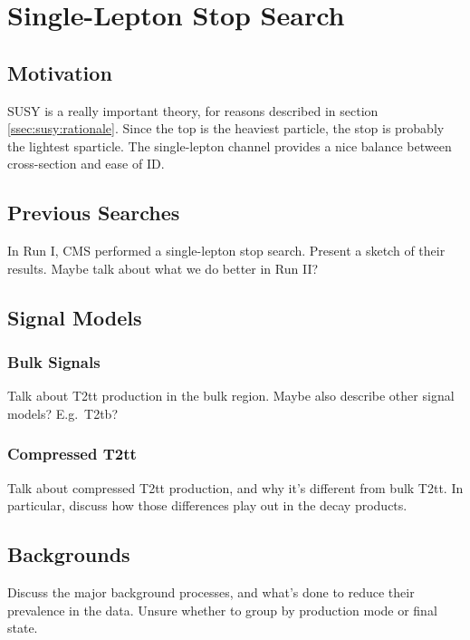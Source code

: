 \chapter{Single-Lepton Stop Search}
\label{chap:stop}

\section{Motivation}
\label{sec:stop:motivation}

SUSY is a really important theory, for reasons described in section \ref{ssec:susy:rationale}.
Since the top is the heaviest particle, the stop is probably the lightest sparticle.
The single-lepton channel provides a nice balance between cross-section and ease of ID.

\section{Previous Searches}
\label{sec:stop:run1}

In Run I, CMS performed a single-lepton stop search.
Present a sketch of their results.
Maybe talk about what we do better in Run II?

\section{Signal Models}
\label{sec:stop:sigmodels}

\subsection{Bulk Signals}
\label{ssec:stop:sigbulk}

Talk about T2tt production in the bulk region.
Maybe also describe other signal models?
E.g.~T2tb?

\subsection{Compressed T2tt}
\label{ssec:stop:sigcompressed}

Talk about compressed T2tt production, and why it's different from bulk T2tt.
In particular, discuss how those differences play out in the decay products.

\section{Backgrounds}
\label{sec:stop:bkgs}

Discuss the major background processes, and what's done to
reduce their prevalence in the data.
Unsure whether to group by production mode or final state.

